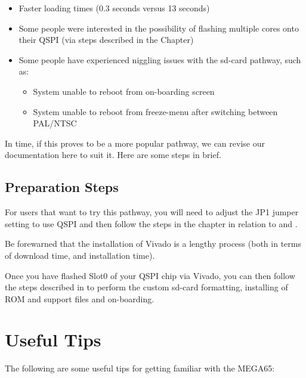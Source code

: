 \begin{itemize}
  \item Faster loading times (0.3 seconds versus 13 seconds)
  \item Some people were interested in the possibility of flashing multiple cores onto their QSPI (via steps described in the  Chapter)
  \item Some people have experienced niggling issues with the sd-card pathway, such as:
    \begin{itemize}
      \item System unable to reboot from on-boarding screen
      \item System unable to reboot from freeze-menu after switching between PAL/NTSC
    \end{itemize}
\end{itemize}

In time, if this proves to be a more popular pathway, we can revise our documentation here to suit it. Here are some steps in brief.

\subsection{Preparation Steps}

For users that want to try this pathway, you will need to adjust the JP1 jumper setting to use QSPI and then follow the steps in the  chapter in relation to  and .

Be forewarned that the installation of Vivado is a lengthy process (both in terms of download time, and installation time).

Once you have flashed Slot0 of your QSPI chip via Vivado, you can then follow the steps described in  to perform the custom sd-card formatting, installing of ROM and support files and on-boarding.

\section{Useful Tips}

The following are some useful tips for getting familiar with the MEGA65:

